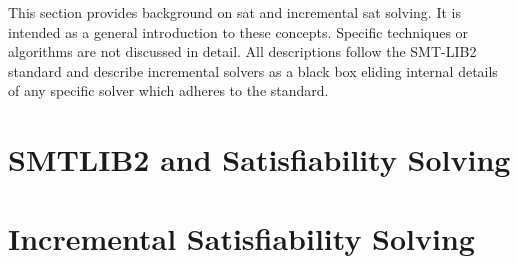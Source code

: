 \label{chapter:background}
%
This section provides background on \ac{sat} and incremental \ac{sat} solving.
It is intended as a general introduction to these concepts. Specific techniques
or algorithms are not discussed in detail. All descriptions follow the
SMT-LIB2~\cite{BarFT-SMTLIB} standard and describe incremental solvers as a
black box eliding internal details of any specific solver which adheres to the
standard.
%
\section{SMTLIB2 and Satisfiability Solving}

%
\section{Incremental Satisfiability Solving}


